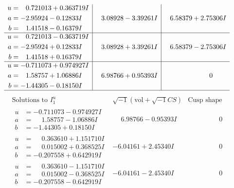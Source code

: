 \documentclass[1p]{elsarticle_modified}
\theoremstyle{definition}
\newcommand{\I}{\sqrt{-1}}
\begin{document}
$$\begin{array}{c|c|c}
\begin{aligned}
u &= \phantom{-}0.721013 + 0.363719 I \\
a &= -2.95924 - 0.12833 I \\
b &= \phantom{-}1.41518 - 0.16379 I\end{aligned}
 & \phantom{-}3.08928 - 3.39261 I & \phantom{-}6.58379 + 2.75306 I \\ \hline\begin{aligned}
u &= \phantom{-}0.721013 - 0.363719 I \\
a &= -2.95924 + 0.12833 I \\
b &= \phantom{-}1.41518 + 0.16379 I\end{aligned}
 & \phantom{-}3.08928 + 3.39261 I & \phantom{-}6.58379 - 2.75306 I \\ \hline\begin{aligned}
u &= -0.711073 + 0.974927 I \\
a &= \phantom{-}1.58757 + 1.06886 I \\
b &= -1.44305 - 0.18150 I\end{aligned}
 & \phantom{-}6.98766 + 0.95393 I & \phantom{-0.000000 } 0\\
 \hline 
 \end{array}$$\newpage$$\begin{array}{c|c|c}  
\text{Solutions to }I^u_{1}& \I (\text{vol} + \sqrt{-1}CS) & \text{Cusp shape}\\
 \hline 
\begin{aligned}
u &= -0.711073 - 0.974927 I \\
a &= \phantom{-}1.58757 - 1.06886 I \\
b &= -1.44305 + 0.18150 I\end{aligned}
 & \phantom{-}6.98766 - 0.95393 I & \phantom{-0.000000 } 0 \\ \hline\begin{aligned}
u &= \phantom{-}0.363610 + 1.151710 I \\
a &= \phantom{-}0.015002 + 0.368525 I \\
b &= -0.207558 + 0.642919 I\end{aligned}
 & -6.04161 + 2.45340 I & \phantom{-0.000000 } 0 \\ \hline\begin{aligned}
u &= \phantom{-}0.363610 - 1.151710 I \\
a &= \phantom{-}0.015002 - 0.368525 I \\
b &= -0.207558 - 0.642919 I\end{aligned}
 & -6.04161 - 2.45340 I & \phantom{-0.000000 } 0 \\ \hline\begin{aligned}

\end{aligned}
\end{array}$$
\end{document}

